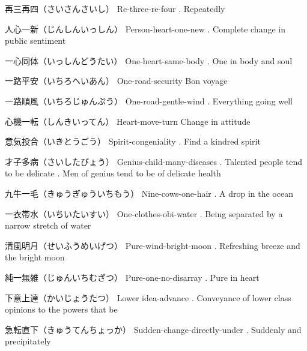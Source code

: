 \par{再三再四（さいさんさいし） \hfill\break
Re-three-re-four \hfill{}. Repeatedly }

\par{人心一新（じんしんいっしん） \hfill\break
Person-heart-one-new \hfill{}. Complete change in public sentiment }

\par{一心同体（いっしんどうたい） \hfill\break
One-heart-same-body \hfill{}. One in body and soul }

\par{一路平安（いちろへいあん） \hfill\break
One-road-security \hfill\break
Bon voyage }

\par{一路順風（いちろじゅんぷう） \hfill\break
One-road-gentle-wind \hfill{}. Everything going well }

\par{心機一転（しんきいってん） \hfill\break
Heart-move-turn \hfill\break
Change in attitude }

\par{意気投合（いきとうごう） \hfill\break
Spirit-congeniality \hfill{}. Find a kindred spirit }

\par{才子多病（さいしたびょう） \hfill\break
Genius-child-many-diseases \hfill{}. Talented people tend to be delicate \hfill{}. Men of genius tend to be of delicate health }

\par{九牛一毛（きゅうぎゅういちもう） \hfill\break
Nine-cows-one-hair \hfill{}. A drop in the ocean }

\par{一衣帯水（いちいたいすい） \hfill\break
One-clothes-obi-water \hfill{}. Being separated by a narrow stretch of water }

\par{清風明月（せいふうめいげつ） \hfill\break
Pure-wind-bright-moon \hfill{}. Refreshing breeze and the bright moon }

\par{純一無雑（じゅんいちむざつ） \hfill\break
Pure-one-no-disarray \hfill{}. Pure in heart }

\par{下意上達（かいじょうたつ） \hfill\break
Lower idea-advance \hfill{}. Conveyance of lower class opinions to the powers that be }

\par{急転直下（きゅうてんちょっか） \hfill\break
Sudden-change-directly-under \hfill{}. Suddenly and precipitately }

